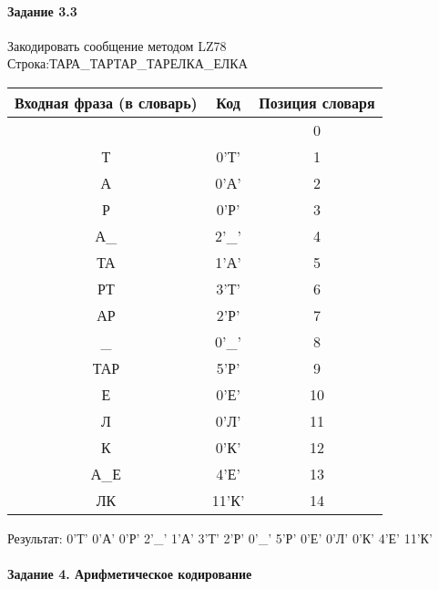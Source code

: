 \documentclass[a4paper, 12pt]{article}
\begin{document}
\paragraph{Задание 3.3}

Закодировать сообщение методом LZ78\\
Строка:ТАРА\_ТАРТАР\_ТАРЕЛКА\_ЕЛКА\\
\begin{table}[h!]
\centering
\begin{tabular}{|c|c|c|} 
\hline
 Входная фраза (в словарь) & Код & Позиция словаря \\ \hline

 &  & 0 \\ \hline
Т & 0'Т' & 1 \\ \hline
А & 0'А' & 2 \\ \hline
Р & 0'Р' & 3 \\ \hline
А\_ & 2'\_' & 4 \\ \hline
ТА & 1'А' & 5 \\ \hline
РТ & 3'Т' & 6 \\ \hline
АР & 2'Р' & 7 \\ \hline
\_ & 0'\_' & 8 \\ \hline
ТАР & 5'Р' & 9 \\ \hline
Е & 0'Е' & 10 \\ \hline
Л & 0'Л' & 11 \\ \hline
К & 0'К' & 12 \\ \hline
А\_Е & 4'Е' & 13 \\ \hline
ЛК & 11'К' & 14 \\ \hline
\end{tabular}
\end{table}

Результат: 0'Т' 0'А' 0'Р' 2'\_' 1'А' 3'Т' 2'Р' 0'\_' 5'Р' 0'Е' 0'Л' 0'К' 4'Е' 11'К'\\
\pagebreak
\paragraph{Задание 4. Арифметическое кодирование\\}
\end{document}

